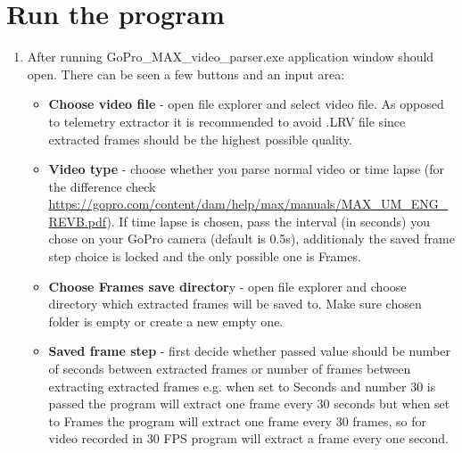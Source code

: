 \documentclass[a4paper,12pt]{book}
\begin{document}
\chapter{Run the program}
\begin{enumerate}
	\item \begin{minipage}[t]{\linewidth}
		\raggedright
		\medskip	
	\end{minipage}
	After running GoPro\_MAX\_video\_parser.exe application window should open.
	There can be seen a few buttons and an input area:
	\begin{itemize}
		\item \textbf{Choose video file} - open file explorer and select video file. As opposed to telemetry extractor it is recommended to avoid .LRV file since extracted frames should be the highest possible quality.
		\item \textbf{Video type} - choose whether you parse normal video or time lapse (for the difference check \url{https://gopro.com/content/dam/help/max/manuals/MAX_UM_ENG_REVB.pdf}). If time lapse is chosen, pass the interval (in seconds) you chose on your GoPro camera (default is 0.5s), additionaly the saved frame step choice is locked and the only possible one is Frames.
		\item \textbf{Choose Frames save director}y - open file explorer and choose directory which extracted frames will be saved to. Make sure chosen folder is empty or create a new empty one.
		\item \textbf{Saved frame step} - first decide whether passed value should be number of seconds between extracted frames or number of frames between extracting extracted frames  e.g. when set to Seconds and number 30 is passed the program will extract one frame every 30 seconds but when set to Frames the program will extract one frame every 30 frames, so for video recorded in 30 FPS program will extract a frame every one second.

\end{itemize}
\end{enumerate}
\end{document}
